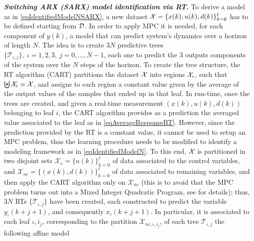 \textbf{\emph{Switching ARX (SARX) model identification via RT.}} To derive a model as in \eqref{eqIdentifiedModelNSARX}, a new dataset $\mathcal{X}= \{x(k),u(k),d(k)\}_{k = 0}^{\ell}$ has to be defined starting from $\mathcal{D}$. In order to apply MPC it is needed, for each component of $y(k)$, a model that can predict system's dynamics over a horizon of length $N$. The idea is to create $3 N$ predictive trees $\{\mathcal{T}_{\iota,j}\},\ \iota=1,2,3,\ j=0,\ldots,N-1$, each one to predict the 3 outputs components of the system over the $N$ steps of the horizon. To create the tree structure, the RT algorithm (CART) partitions the dataset $\mathcal{X}$ into regions $\mathcal{X}_i$, such that $\biguplus \mathcal{X}_i = \mathcal{X}$, and assigns to each region a constant value given by the average of the output values of the samples that ended up in that leaf. In run-time, once the trees are created, and given a real-time measurement $(x(k), u(k), d(k))$ belonging to leaf $i$, the CART algorithm provides as a prediction the averaged value associated to the leaf as in \eqref{eqAverageResponseRT}. However, since the prediction provided by the RT is a constant value, it cannot be used to setup an MPC problem, thus the learning procedure needs to be modified to identify a modeling framework as in \eqref{eqIdentifiedModelN}. To this end, $\mathcal{X}$ is partitioned in two disjoint sets $\mathcal{X}_c = \{u(k)\}_{k=0}^{\ell}$ of data associated to the control variables, and $\mathcal{X}_{nc} = \{(x(k), d(k))\}_{k=0}^{\ell}$ of data associated to remaining variables, and then apply the CART algorithm only on $\mathcal{X}_{nc}$ (this is to avoid that the MPC problem turns out into a Mixed Integer Quadratic Program, see \cite{SmarraADHS2018,smarraNAHS2020} for details); thus, $3 N$ RTs $\{\mathcal{T}_{\iota,j}\}$ have been created, each constructed to predict the variable $y_\iota(k+j+1)$, and consequently $x_\iota(k+j+1)$. In particular, it is associated to each leaf $\iota,i_j$, corresponding to the partition  $\mathcal{X}_{nc,\iota,i_j}$, of each tree $\mathcal{T}_{\iota,j}$ the following affine model

\small

